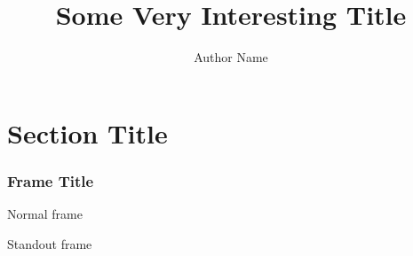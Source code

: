 \documentclass{beamer}
\title{Some Very Interesting Title}
\author{Author Name}
\institute{Cool Conference}
\begin{document}
\maketitle

\section{Section Title}

\begin{frame}
  \frametitle{Frame Title}
  Normal frame
\end{frame}

\begin{frame}[standout]
  Standout frame
\end{frame}
\end{document}
